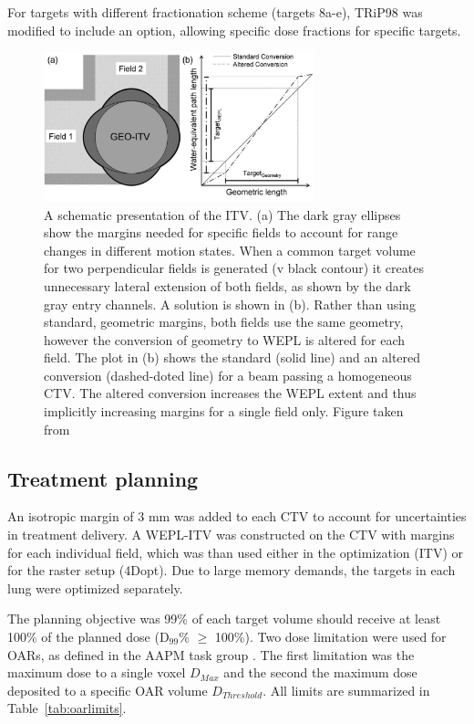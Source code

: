 For targets with different fractionation scheme (targets 8a-e), TRiP98 was modified to include an option, allowing specific dose fractions for specific targets.


\begin{figure}[H]
	\begin{center}
		\includegraphics[width=0.7\textwidth]{./ComplexPatients/Images/weplITV.png}
		\caption{A schematic presentation of the ITV. (a) The dark gray ellipses show the margins needed for specific fields to account for range changes in different motion states.
		When a common target volume for two perpendicular fields is generated (v black contour) it creates unnecessary lateral extension of both fields, as shown by the dark gray
		entry channels. A solution is shown in (b). Rather than using standard, geometric margins, both fields use the same geometry, however the conversion of geometry to WEPL
		is altered for each field. The plot in (b) shows the standard (solid line) and an altered conversion (dashed-doted line) for a beam passing a homogeneous CTV. The altered conversion
		increases the WEPL extent and thus implicitly increasing margins for a single field only. Figure taken from \cite{Graeff2012}}
		\label{Fig:weplITV}
	\end{center}
\end{figure}

\subsection{Treatment planning}

An isotropic margin of 3 mm was added to each CTV to account for uncertainties in treatment delivery. 
A WEPL-ITV was constructed on the CTV with margins for each individual field, which was than used either in the optimization (ITV)
or for the raster setup (4Dopt). Due to large memory demands, the targets in each lung were optimized separately. 
  
The planning objective was 99\% of each target volume should receive at least 100\% of the planned dose (D$_{99}$\% $\geq$ 100\%). Two dose limitation were used for OARs, as defined in 
the AAPM task group \cite{Benedict2010}. The first limitation was the maximum dose to a single voxel $D_{Max}$ and the second the maximum dose deposited to a 
specific OAR volume $D_{Threshold}$. All limits are summarized in Table~\ref{tab:oarlimits}.
 
